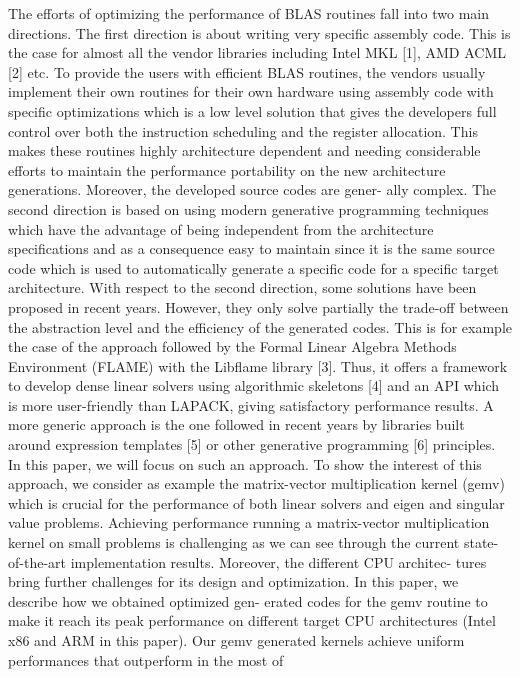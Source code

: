 \documentclass[../../main.tex]{subfiles}
\begin{document}
The efforts of optimizing the performance of BLAS routines
fall into two main directions. The first direction is about
writing very specific assembly code. This is the case for
almost all the vendor libraries including Intel MKL [1], AMD
ACML [2] etc. To provide the users with efficient BLAS
routines, the vendors usually implement their own routines
for their own hardware using assembly code with specific
optimizations which is a low level solution that gives the
developers full control over both the instruction scheduling
and the register allocation. This makes these routines highly
architecture dependent and needing considerable efforts to
maintain the performance portability on the new architecture
generations. Moreover, the developed source codes are gener-
ally complex. The second direction is based on using modern
generative programming techniques which have the advantage
of being independent from the architecture specifications and
as a consequence easy to maintain since it is the same source
code which is used to automatically generate a specific code
for a specific target architecture. With respect to the second
direction, some solutions have been proposed in recent years.
However, they only solve partially the trade-off between the
abstraction level and the efficiency of the generated codes.
This is for example the case of the approach followed by
the Formal Linear Algebra Methods Environment (FLAME)
with the Libflame library [3]. Thus, it offers a framework to
develop dense linear solvers using algorithmic skeletons [4]
and an API which is more user-friendly than LAPACK, giving
satisfactory performance results. A more generic approach is
the one followed in recent years by \cpp libraries built around
expression templates [5] or other generative programming [6]
principles. In this paper, we will focus on such an approach.
To show the interest of this approach, we consider as
example the matrix-vector multiplication kernel (gemv) which
is crucial for the performance of both linear solvers and eigen
and singular value problems. Achieving performance running
a matrix-vector multiplication kernel on small problems is
challenging as we can see through the current state-of-the-art
implementation results. Moreover, the different CPU architec-
tures bring further challenges for its design and optimization.
In this paper, we describe how we obtained optimized gen-
erated \cpp codes for the gemv routine to make it reach its
peak performance on different target CPU architectures (Intel
x86 and ARM in this paper). Our gemv \cpp generated kernels
achieve uniform performances that outperform in the most of
\end{document}
